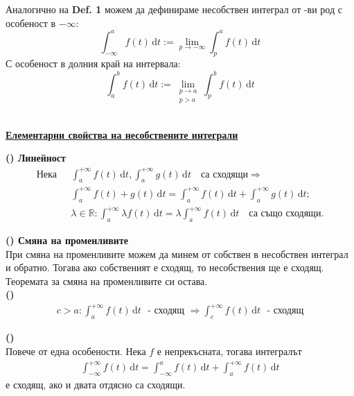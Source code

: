\documentclass[12pt]{article}
\newcommand{\RNum}[1]{\uppercase\expandafter{\romannumeral #1\relax}}
\newcommand{\spc}{\text{ }}
\begin{document}
	Аналогично на \textbf{Def. 1} можем да дефинираме несобствен интеграл от \RNum{1}-ви род с особеност в $-\infty$:
	\[\int_{-\infty}^{a}f(t)\,\mathrm{d}t := \lim_{p\to -\infty}\int_{p}^{a}f(t)\,\mathrm{d}t\] 
	С особеност в долния край на интервала:
	\[\int_{a}^{b}f(t)\,\mathrm{d}t := \lim_{\substack{p\to a \\ p>a}}\int_{p}^{b}f(t)\,\mathrm{d}t\]\\
	
	\begin{center}
		\textbf{\large\underline{Елементарни свойства на несобствените интеграли}}
	\end{center}
	
	\textbf{(\RNum{1}) Линейност}\\
	\[
	\begin{aligned}
		\text{Нека}\spc &\int_{a}^{+\infty}f(t)\,\mathrm{d}t, \int_{a}^{+\infty}g(t)\,\mathrm{d}t \spc\text{ са сходящи} \Rightarrow \\
		&\int_{a}^{+\infty}f(t) + g(t)\,\mathrm{d}t = \int_{a}^{+\infty}f(t)\,\mathrm{d}t + \int_{a}^{+\infty}g(t)\,\mathrm{d}t\text{;}\\
		&\lambda\in\mathbb{R}:
		\int_{a}^{+\infty}\lambda f(t)\,\mathrm{d}t = \lambda\int_{a}^{+\infty}f(t)\,\mathrm{d}t\spc\text{ са също сходящи.}
	\end{aligned}
	\]
	
	\textbf{(\RNum{2}) Смяна на променливите}\\
	При смяна на променливите можем да минем от собствен в несобствен интеграл и обратно. Тогава ако собственият е сходящ, то несобствения ще е сходящ. Теоремата за смяна на променливите си остава.\\
	
	\textbf{(\RNum3)}\\
	\[
	\begin{aligned}
		c>a: \int_{a}^{+\infty}f(t)\,\mathrm{d}t \spc\text{- сходящ }\Rightarrow\int_{c}^{+\infty}f(t)\,\mathrm{d}t \spc\text{- сходящ}
	\end{aligned}
	\]
	
	\textbf{(\RNum4)}\\
	Повече от една особености. Нека $f$ е непрекъсната, тогава интегралът
	\[
	\begin{aligned}
		\int_{-\infty}^{+\infty}f(t)\,\mathrm{d}t = \int_{-\infty}^{a}f(t)\,\mathrm{d}t + \int_{a}^{+\infty}f(t)\,\mathrm{d}t
	\end{aligned}
	\]
	е сходящ, ако и двата отдясно са сходящи.\\
	
\end{document}
